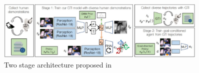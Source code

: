 \begin{figure}[htb!]
    \centering
    \includegraphics[width=0.9\textwidth]{Figures/images/gti/gti_architecture.jpg}
    \caption{Two stage architecture proposed in \cite{Mandlekar2020GTI}}
    \label{fig:gti_architecture}
\end{figure}
